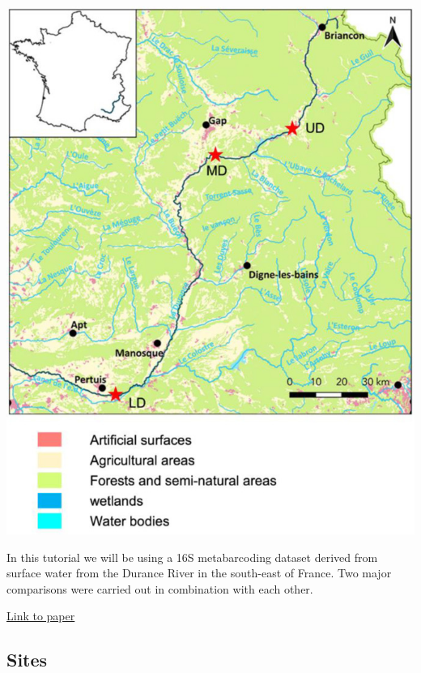 \documentclass[
]{book}
\begin{document}
\includegraphics{figures/freshwater_france.png}

In this tutorial we will be using a 16S metabarcoding dataset derived from surface water from the Durance River in the south-east of France.
Two major comparisons were carried out in combination with each other.

\href{https://www.mdpi.com/2076-2607/8/8/1129}{Link to paper}

\hypertarget{sites}{%
\subsection{Sites}\label{sites}}
\end{document}
